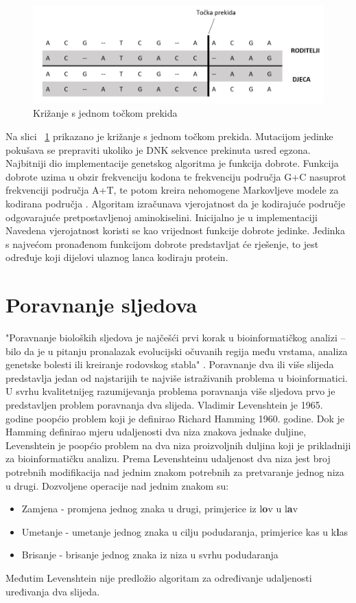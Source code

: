 \documentclass[times, utf8, zavrsni, numeric]{fer}
\begin{document}
\begin{figure}[htb]
	\includegraphics[width=\linewidth]{slike/crossover.PNG}
	\centering
	\caption{Križanje s jednom točkom prekida}
	\label{fig:crossover}
\end{figure}
Na slici ~\ref{fig:crossover} prikazano je križanje s jednom točkom prekida. Mutacijom jedinke pokušava se prepraviti ukoliko je DNK sekvence prekinuta usred egzona. Najbitniji dio implementacije genetskog algoritma je funkcija dobrote. Funkcija dobrote uzima u obzir frekvenciju kodona te frekvenciju područja G+C nasuprot frekvenciji područja A+T, te potom kreira nehomogene Markovljeve modele za kodirana područja \cite{applicationOfBioinformatics}. Algoritam izračunava vjerojatnost da je kodirajuće područje odgovarajuće pretpostavljenoj aminokiselini. Inicijalno je u implementaciji  Navedena vjerojatnost koristi se kao vrijednost funkcije dobrote jedinke. Jedinka s najvećom pronađenom funkcijom dobrote predstavljat će rješenje, to jest određuje koji dijelovi ulaznog lanca kodiraju protein. 

\section{Poravnanje sljedova} \label{poravnanje}
"Poravnanje bioloških sljedova je najčešći prvi korak u bioinformatičkog analizi – bilo da je
u pitanju pronalazak evolucijski očuvanih regija među vrstama, analiza genetske bolesti ili
kreiranje rodovskog stabla" \cite{bioinformatikaSkripta}. Poravnanje dva ili više slijeda predstavlja jedan od najstarijih te najviše istraživanih problema u bioinformatici.
U svrhu kvalitetnijeg razumijevanja problema poravnanja više sljedova prvo je predstavljen problem poravnanja dva slijeda. Vladimir Levenshtein je 1965. godine poopćio problem koji je definirao  Richard Hamming 1960. godine. Dok je Hamming definirao mjeru udaljenosti dva niza znakova jednake duljine, Levenshtein je poopćio problem na dva niza proizvoljnih duljina koji je prikladniji za bioinformatičku analizu. Prema Levenshteinu udaljenost dva niza jest broj potrebnih modifikacija nad jednim znakom potrebnih za pretvaranje jednog niza u drugi. Dozvoljene operacije nad jednim znakom su:
 \begin{itemize}
 	\item Zamjena - promjena jednog znaka u drugi, primjerice iz l\textbf{o}v u l\textbf{a}v
 	\item Umetanje - umetanje jednog znaka u cilju podudaranja, primjerice kas u k\textbf{l}as
 	\item Brisanje - brisanje jednog znaka iz niza u svrhu podudaranja
\end{itemize}
Međutim Levenshtein nije predložio algoritam za određivanje udaljenosti uređivanja dva slijeda.
\end{document}
